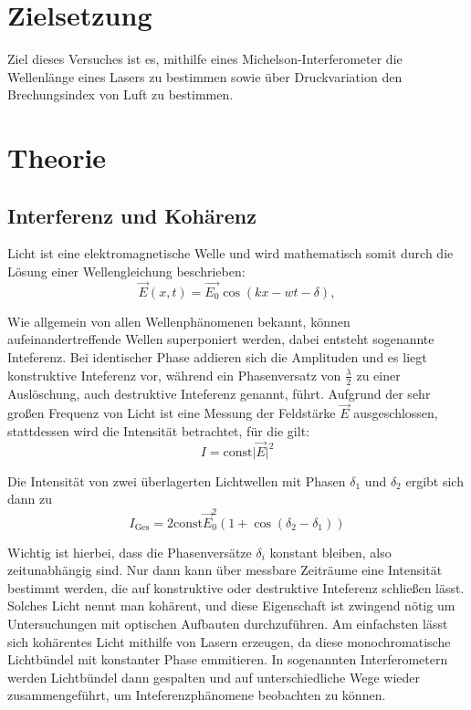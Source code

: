 \section{Zielsetzung}

Ziel dieses Versuches ist es, mithilfe eines Michelson-Interferometer die Wellenlänge
eines Lasers zu bestimmen sowie über Druckvariation den Brechungsindex von Luft zu bestimmen.

\section{Theorie}
\label{sec:Theorie}

\subsection{Interferenz und Kohärenz}

Licht ist eine elektromagnetische Welle und wird mathematisch somit durch die Lösung einer Wellengleichung beschrieben:
\begin{equation*}
    \vec{E}(x,t) = \vec{E_0} \cos(kx-wt-\delta),
\end{equation*}

Wie allgemein von allen Wellenphänomenen bekannt, können aufeinandertreffende Wellen superponiert werden,
dabei entsteht sogenannte Inteferenz.
Bei identischer Phase addieren sich die Amplituden und es liegt konstruktive Inteferenz vor, während ein
Phasenversatz von $\frac{\lambda}{2}$ zu einer Auslöschung, auch destruktive Inteferenz genannt, führt.
Aufgrund der sehr großen Frequenz von Licht ist eine Messung der Feldstärke $\vec{E}$ ausgeschlossen, stattdessen
wird die Intensität betrachtet, für die gilt:
\begin{equation*}
    I = \text{const}\lvert \vec{E} \rvert^2
\end{equation*}

Die Intensität von zwei überlagerten Lichtwellen mit Phasen $\delta_1$ und $\delta_2$ ergibt sich dann zu
\begin{equation*}
    I_\text{Ges} = 2 \text{const}\vec{E}_0^2(1 + \cos(\delta_2 - \delta_1))
\end{equation*}

Wichtig ist hierbei, dass die Phasenversätze $\delta_i$ konstant bleiben, also zeitunabhängig sind.
Nur dann kann über messbare Zeiträume eine Intensität bestimmt werden, die auf konstruktive oder destruktive
Inteferenz schließen lässt.
Solches Licht nennt man kohärent, und diese Eigenschaft ist zwingend nötig um Untersuchungen
mit optischen Aufbauten durchzuführen.
Am einfachsten lässt sich kohärentes Licht mithilfe von Lasern erzeugen, da diese monochromatische Lichtbündel
mit konstanter Phase emmitieren.
In sogenannten Interferometern werden Lichtbündel dann gespalten und auf unterschiedliche Wege wieder zusammengeführt,
um Inteferenzphänomene beobachten zu können.


